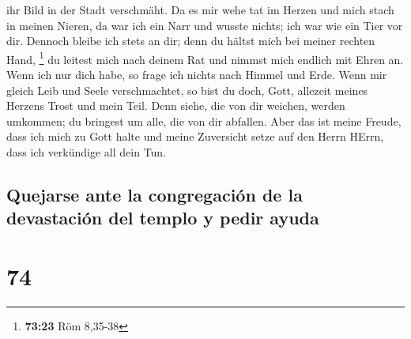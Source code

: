ihr Bild in der Stadt verschmäht.  Da es mir wehe tat im
Herzen und mich stach in meinen Nieren,  da war ich ein
Narr und wusste nichts; ich war wie ein Tier vor dir. 
Dennoch bleibe ich stets an dir; denn du hältst mich bei meiner rechten
Hand, \footnote{\textbf{73:23} Röm 8,35-38}  du leitest
mich nach deinem Rat und nimmst mich endlich mit Ehren an.
 Wenn ich nur dich habe, so frage ich nichts nach Himmel
und Erde.  Wenn mir gleich Leib und Seele verschmachtet,
so bist du doch, Gott, allezeit meines Herzens Trost und mein Teil.
 Denn siehe, die von dir weichen, werden umkommen; du
bringest um alle, die von dir abfallen.  Aber das ist
meine Freude, dass ich mich zu Gott halte und meine Zuversicht setze auf
den Herrn HErrn, dass ich verkündige all dein Tun.

\hypertarget{quejarse-ante-la-congregaciuxf3n-de-la-devastaciuxf3n-del-templo-y-pedir-ayuda}{%
\subsection{Quejarse ante la congregación de la devastación del templo y
pedir
ayuda}\label{quejarse-ante-la-congregaciuxf3n-de-la-devastaciuxf3n-del-templo-y-pedir-ayuda}}

\hypertarget{section-73}{%
\section{74}\label{section-73}}

